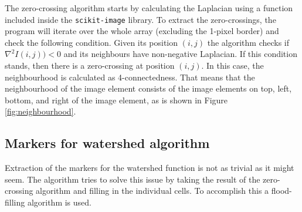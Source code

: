 \documentclass[
  digital,     %
  oneside,     %
  nosansbold,  %
  nocolorbold, %
  lof,         %
  lot,         %
]{fithesis4}
\begin{document}
The zero-crossing algorithm starts by calculating the Laplacian using a function
included inside the \texttt{scikit-image} library. To
extract the zero-crossings, the program will iterate over the whole array
(excluding the 1-pixel border) and check the following condition. Given its position $(i, j)$
the algorithm checks if $\nabla^2 I(i, j)) < 0$ and its neighbours have
non-negative Laplacian.  If this condition stands, then there is
a zero-crossing at position $(i, j)$. In this case, the neighbourhood is
calculated as 4-connectedness. That means that the neighbourhood of the image element
consists of the image elements on top, left, bottom, and right of the image element, as is
shown in Figure \ref{fig:neighbourhood}.

\subsection{Markers for watershed algorithm}
\label{sec-markers}
Extraction of the markers for the watershed function is not as trivial as it
might seem. The algorithm tries to solve this issue by taking the result of the
zero-crossing algorithm and filling in the individual cells. To accomplish this
a flood-filling algorithm is used.
\end{document}

